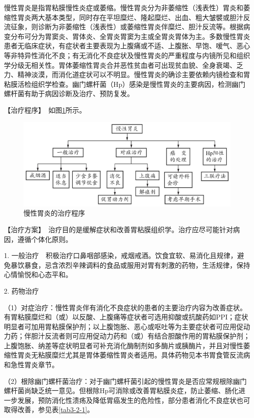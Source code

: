 慢性胃炎是指胃粘膜慢性炎症或萎缩。慢性胃炎分为非萎缩性（浅表性）胃炎和萎缩性胃炎两大基本类型，同时存在平坦糜烂、隆起糜烂、出血、粗大皱襞或胆汁反流征象，则诊断为非萎缩性（浅表性）或萎缩性胃炎伴糜烂、胆汁反流等。根据病变分布可分为胃窦炎、胃体炎、全胃炎胃窦为主或全胃炎胃体为主。多数慢性胃炎患者无临床症状，有症状者主要表现为上腹痛或不适、上腹胀、早饱、嗳气、恶心等非特异性消化不良；有无消化不良症状及慢性胃炎的严重程度与内镜所见和组织学分级无相关性。胃体萎缩性胃炎合并恶性贫血者可出现贫血貌、全身衰竭、乏力、精神淡漠，而消化道症状可以不明显。慢性胃炎的确诊主要依赖内镜检查和胃粘膜活检组织学检查。幽门螺杆菌（Hp）感染是慢性胃炎的主要病因，检测幽门螺杆菌有助于病因诊断及治疗、预防复发。

【治疗程序】　如图\ref{fig3-2-2}所示。

\begin{figure}[!htbp]
 \centering
 \includegraphics{./images/Image00088.jpg}
 \captionsetup{justification=centering}
 \caption{慢性胃炎的治疗程序}
 \label{fig3-2-2}
  \end{figure} 

【治疗方案】　治疗目的是缓解症状和改善胃粘膜组织学。治疗应尽可能针对病因，遵循个体化原则。

1.
一般治疗　积极治疗口鼻咽部感染，戒烟戒酒。饮食宜软、易消化且规律，避免暴饮暴食，忌含浓烈辛辣调料的食品或服用对胃有刺激的药物，生活规律，保持心情愉悦和心态平和。

2. 药物治疗

（1）对症治疗：慢性胃炎伴有消化不良症状的患者的主要治疗内容为改善症状。有胃粘膜糜烂和（或）以反酸、上腹痛等症状者可选用抑酸或抗酸药如PPI；症状明显者可加用胃粘膜保护剂；以上腹饱胀、恶心或呕吐等为主要症状者可应用促动力药；伴胆汁反流者则可应用促动力药和（或）有结合胆酸作用的胃粘膜保护剂；上腹饱胀、纳差等症状明显者可补充消化酶制剂如多酶片或胰酶片，并且对慢性萎缩性胃炎无粘膜糜烂尤其是胃体萎缩性胃炎者适用。具体药物见本书胃食管反流病和急性胃炎章节。

（2）根除幽门螺杆菌治疗：对于幽门螺杆菌引起的慢性胃炎是否应常规根除幽门螺杆菌尚缺乏统一意见。但根除Hp可消除或改善胃粘膜炎症，防止萎缩、肠化进一步发展，预防消化性溃疡及降低胃癌发生的危险性，部分患者消化不良症状也可取得改善，参见表\ref{tab3-2-1}。

